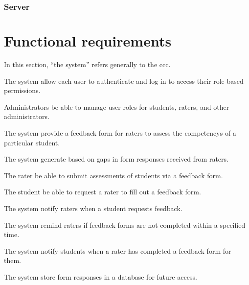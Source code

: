 \documentclass[letterpaper,article,oneside]{memoir}
\begin{document}

\subsubsection{Server}


\section{Functional requirements}

In this section, ``the system'' refers generally to the \gls{ccc}.

\begin{requirements}
   The system  allow each \gls{user} to authenticate and log in to access their role-based permissions.

   Administrators  be able to manage user roles for \glspl{student}, \glspl{rater}, and other administrators.
   \dep{\ref{req:sw3}}

   The system  provide a \gls{feedback form} for \glspl{rater} to assess the \glspl{competency} of a particular \gls{student}.

   The system  generate  based on gaps in \glspl{form response} received from \glspl{rater}.
   \dep{\ref{req:r1}}

   The \gls{rater}  be able to submit assessments of \glspl{student} via a \gls{feedback form}.
   \dep{\ref{req:r1}}

   The student  be able to request a \gls{rater} to fill out a \gls{feedback form}.
   \dep{\ref{req:r4}}

   The system  notify \glspl{rater} when a \gls{student} requests feedback.
   \dep{\ref{req:s2}}

   The system  remind \glspl{rater} if \glspl{feedback form} are not completed within a specified time.
   \dep{\ref{req:r5}}

   The system  notify \glspl{student} when a \gls{rater} has completed a \gls{feedback form} for them.
   \dep{\ref{req:r4}}

   
   \dep{\ref{req:r4}}

   The system  store \glspl{form response} in a database for future access.
   \dep{\ref{req:r4}}


\end{requirements}
\end{document}
